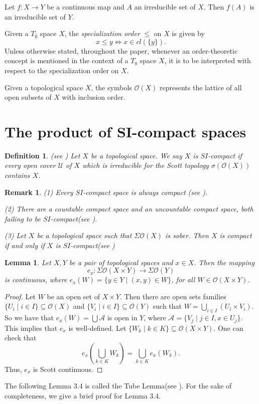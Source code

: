 \documentclass[preprint,12pt]{elsarticle}
\numberwithin{equation}{section}
\newtheorem{lemma}[theorem]{Lemma}
\newtheorem{definition}[theorem]{Definition}
\newtheorem{remark}[theorem]{Remark}
\begin{document}
\quad Let $f:X\longrightarrow Y$ be a continuous map and $A$ an irreducible set of $X$. Then $f(A)$ is an irreducible set of $Y$.

\quad Given a $T_{0}$ space $X$, the {\em specialization order} $\leq$ on $X$ is given by
$$x\leq y \Longleftrightarrow x\in cl(\{y\}).$$
Unless otherwise stated, throughout
the paper, whenever an order-theoretic concept is mentioned in the context of a $T_{0}$ space $X$, it is to be interpreted with respect to the specialization order on $X$.

\quad Given a topological space $X$, the symbols $\mathcal{O}(X)$ represents the lattice of all open subsets of $X$ with inclusion order.


\section{The product of SI-compact spaces}\label{sec:fm}




\begin{definition} {\rm (see \cite{DME15})
Let $X$ be a topological space. We say $X$ is $SI$-compact if  every open cover $\mathcal{U}$ of $X$ which is irreducible for the Scott topology $\sigma(\mathcal{O}(X))$ contains $X$.}
\end{definition}


\begin{remark} {\rm(1) Every $SI$-compact space is always compact (see \cite{DME15}).

(2) There are a countable compact space and an uncountable compact space, both failing to be $SI$-compact(see \cite{HWQ21,A11}).

(3) Let $X$ be a topological space such that $\Sigma\mathcal{O}(X)$ is sober. Then $X$ is compact if and only if $X$ is $SI$-compact(see \cite{HWQ21})}
\end{remark}

\begin{lemma}{\rm Let $X,Y$ be a pair of topological spaces and $x\in X$. Then the mapping $$e_{x}:\Sigma\mathcal{O}(X\times Y)\longrightarrow\Sigma\mathcal{O}(Y)$$ is continuous, where $e_{x}(W)=\{y\in Y\mid (x,y)\in W\}$, for all $W\in\mathcal{O}(X\times Y)$.}
\end{lemma}

\begin{proof}Let $W$ be an open set of $X\times Y$. Then there are open sets families $\{U_{i}\mid i\in I\}\subseteq\mathcal{O}(X)$ and $\{V_{i}\mid i\in I\}\subseteq\mathcal{O}(Y)$ such that $W=\bigcup\limits_{i\in I}(U_{i}\times V_{i})$. So we have that $e_{x}(W)=\bigcup\mathcal{A}$ is open in $Y$, where $\mathcal{A}=\{V_{j}\mid j\in I, x\in U_{j}\}$. This implies that $e_{x}$ is well-defined. Let $\{W_{k}\mid k\in K\}\subseteq\mathcal{O}(X\times Y)$. One can check that
$$e_{x}(\bigcup\limits_{k\in K}W_{k})=\bigcup\limits_{k\in K}e_{x}(W_{k}).$$ Thus, $e_{x}$ is Scott continuous.\end{proof}
The following Lemma 3.4 is called the Tube Lemma(see \cite{RE77}). For the sake of completeness, we give a brief proof for Lemma 3.4. 
\end{document}

